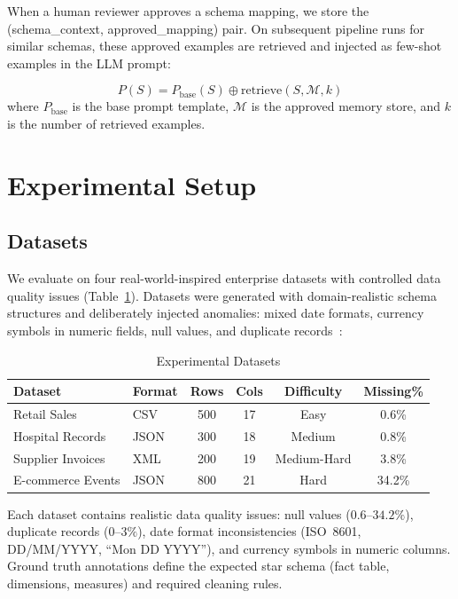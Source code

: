 \documentclass[conference]{IEEEtran}
\begin{document}
When a human reviewer approves a schema mapping, we store the
(schema\_context, approved\_mapping) pair. On subsequent pipeline runs
for similar schemas, these approved examples are retrieved and injected
as few-shot examples in the LLM prompt:

\begin{equation}
P(S) = P_{\text{base}}(S) \oplus \text{retrieve}(S, \mathcal{M}, k)
\label{eq:memory}
\end{equation}
where $P_{\text{base}}$ is the base prompt template, $\mathcal{M}$ is
the approved memory store, and $k$ is the number of retrieved examples.

\section{Experimental Setup}
\label{sec:experiments}

\subsection{Datasets}

We evaluate on four real-world-inspired enterprise datasets with controlled
data quality issues (Table~\ref{tab:datasets}). Datasets were generated
with domain-realistic schema structures and deliberately injected anomalies:
mixed date formats, currency symbols in numeric fields, null values, and
duplicate records~\cite{kimball2013}:

\begin{table}[htbp]
\centering
\caption{Experimental Datasets}
\label{tab:datasets}
\begin{tabular}{llcccc}
\toprule
Dataset & Format & Rows & Cols & Difficulty & Missing\% \\
\midrule
Retail Sales & CSV & 500 & 17 & Easy & 0.6\% \\
Hospital Records & JSON & 300 & 18 & Medium & 0.8\% \\
Supplier Invoices & XML & 200 & 19 & Medium-Hard & 3.8\% \\
E-commerce Events & JSON & 800 & 21 & Hard & 34.2\% \\
\bottomrule
\end{tabular}
\end{table}

Each dataset contains realistic data quality issues: null values
($0.6$--$34.2\%$), duplicate records ($0$--$3\%$), date format
inconsistencies (ISO~8601, DD/MM/YYYY, ``Mon DD YYYY''), and currency
symbols in numeric columns. Ground truth annotations define the expected star
schema (fact table, dimensions, measures) and required cleaning rules.
\end{document}
